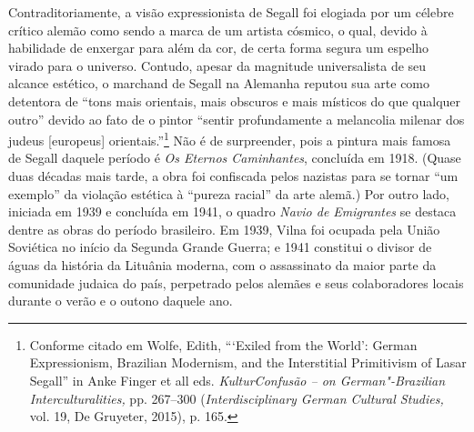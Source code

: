 Contraditoriamente, a visão expressionista de Segall foi elogiada por um
célebre crítico alemão como sendo a marca de um artista cósmico, o qual,
devido à habilidade de enxergar para além da cor, de certa forma segura
um espelho virado para o universo. Contudo, apesar da magnitude
universalista de seu alcance estético, o marchand de Segall na Alemanha
reputou sua arte como detentora de ``tons mais orientais, mais obscuros
e mais místicos do que qualquer outro'' devido ao fato de o pintor
``sentir profundamente a melancolia milenar dos judeus {[}europeus{]}
orientais.''\footnote{Conforme citado em Wolfe, Edith, ```Exiled from
  the World': German Expressionism, Brazilian Modernism, and the
  Interstitial Primitivism of Lasar Segall'' in Anke Finger et all eds.
  \emph{KulturConfusão -- on German"-Brazilian Interculturalities,} pp.
  267--300 (\emph{Interdisciplinary German Cultural Studies,} vol. 19, De
  Gruyeter, 2015), p. 165.} Não é de surpreender, pois a pintura mais
famosa de Segall daquele período é \emph{Os Eternos Caminhantes},
concluída em 1918. (Quase duas décadas mais tarde, a obra foi confiscada
pelos nazistas para se tornar ``um exemplo'' da violação estética à
``pureza racial'' da arte alemã.) Por outro lado, iniciada em 1939 e
concluída em 1941, o quadro \emph{Navio de Emigrantes} se destaca dentre
as obras do período brasileiro. Em 1939, Vilna foi ocupada pela União
Soviética no início da Segunda Grande Guerra; e 1941 constitui o divisor
de águas da história da Lituânia moderna, com o assassinato da maior
parte da comunidade judaica do país, perpetrado pelos alemães e seus
colaboradores locais durante o verão e o outono daquele ano.

